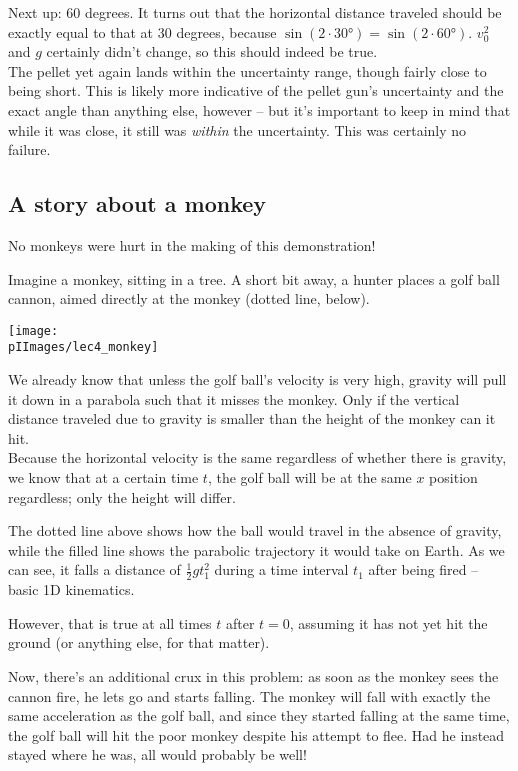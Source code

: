 Next up: 60 degrees. It turns out that the horizontal distance traveled should be exactly equal to that at 30 degrees, because $\sin({2\cdot\ang{30}}) = \sin({2\cdot\ang{60}})$. $v_0^2$ and $g$ certainly didn't change, so this should indeed be true.\\
The pellet yet again lands within the uncertainty range, though fairly close to being short. This is likely more indicative of the pellet gun's uncertainty and the exact angle than anything else, however -- but it's important to keep in mind that while it was close, it still was \emph{within} the uncertainty. This was certainly no failure.

\subsection{A story about a monkey}

No monkeys were hurt in the making of this demonstration!

Imagine a monkey, sitting in a tree. A short bit away, a hunter places a golf ball cannon, aimed directly at the monkey (dotted line, below).

\begin{center}
\texttt{[image: \\pIImages/lec4\_monkey]}
\end{center}

We already know that unless the golf ball's velocity is very high, gravity will pull it down in a parabola such that it misses the monkey. Only if the vertical distance traveled due to gravity is smaller than the height of the monkey can it hit.\\
Because the horizontal velocity is the same regardless of whether there is gravity, we know that at a certain time $t$, the golf ball will be at the same $x$ position regardless; only the height will differ.

The dotted line above shows how the ball would travel in the absence of gravity, while the filled line shows the parabolic trajectory it would take on Earth. As we can see, it falls a distance of $\frac{1}{2} g t_1^2$ during a time interval $t_1$ after being fired -- basic 1D kinematics.

However, that is true at all times $t$ after $t = 0$, assuming it has not yet hit the ground (or anything else, for that matter).

Now, there's an additional crux in this problem: as soon as the monkey sees the cannon fire, he lets go and starts falling. The monkey will fall with exactly the same acceleration as the golf ball, and since they started falling at the same time, the golf ball will hit the poor monkey despite his attempt to flee. Had he instead stayed where he was, all would probably be well!

